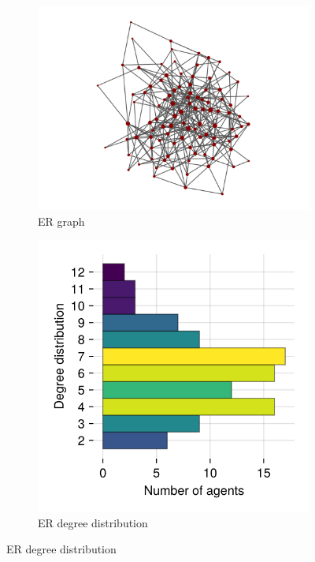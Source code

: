 \documentclass[]{article}
\begin{document}
\begin{figure}
	\begin{subfigure}{0.45\textwidth}
		\centering
		\includegraphics[width=0.8\linewidth]{../plots/g_erdosrenyi_n100_p3_s33} 
		\caption{ER graph}  \label{fig:subim11}
	\end{subfigure}
	\hspace{-1cm}
	\begin{subfigure}{0.45\textwidth}
		\centering
		\includegraphics[width=0.5\linewidth]{../plots/g_erdosrenyi_hist_degree_n100_p3_s33}
		\caption{ER degree distribution} \label{fig:subim12}
	\end{subfigure}
	

\end{figure}
\end{document}
